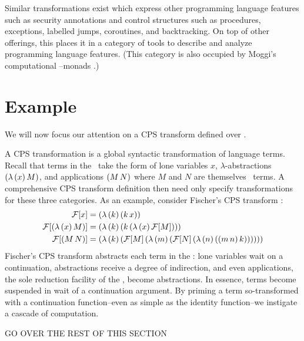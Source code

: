 Similar transformations exist which express other programming language features such as
security annotations \cite{wallach2000safkasi} and control structures such as procedures,
exceptions, labelled jumps, coroutines, and backtracking. On top of other offerings, this
places it in a category of tools to describe and analyze programming language features.
(This category is also occupied by Moggi's computational \lc--monads
\cite{moggi1989computational}.)

\section{Example}

We will now focus our attention on a CPS transform defined over \lv.

A CPS transformation is a global syntactic transformation of language terms. Recall that
terms in the \lc\ take the form of lone variables $x$, $\lambda$-abstractions
$(\lambda\,(x)\,M)$, and applications $(M\,N)$ where $M$ and $N$ are themselves \lc\ terms. A
comprehensive CPS transform definition then need only specify transformations for these
three categories. As an example, consider Fischer's CPS transform \cite{fischer1972lambda}:
\begin{align*}
\mathcal{F}[x]          &= (\lambda\,(k)\,(k\,x))\\
\mathcal{F}[(\lambda\,(x)\,M)] &= (\lambda\,(k)\,(k\,(\lambda\,(x)\,\mathcal{F}[M])))\\
\mathcal{F}[(M\,N)] &= (\lambda\,(k)\,(\mathcal{F}[M]\,(\lambda\,(m)\,(\mathcal{F}[N]\,(\lambda\,(n)\,((m\,n)\,k))))))
\end{align*}
Fischer's CPS transform abstracts each term in the \lc: lone variables wait on a
continuation, abstractions receive a degree of indirection, and even applications, the
sole reduction facility of the \lc, become abstractions. In essence, terms become
suspended in wait of a continuation argument. By priming a term so-transformed with a
continuation function--even as simple as the identity function--we instigate a cascade of
computation.

GO OVER THE REST OF THIS SECTION

